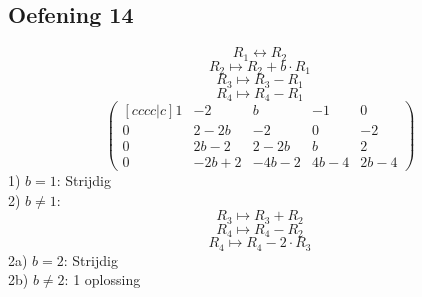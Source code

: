 \documentclass[lineaire_algebra_oplossingen.tex]{subfiles}
\begin{document}
\subsection{Oefening 14}
\[R_1 \leftrightarrow R_2 \]
\[R_2 \longmapsto R_2 + b\cdot R_1\]
\[R_3 \longmapsto R_3 - R_1\]
\[R_4 \longmapsto R_4 - R_1\]
\[
\begin{pmatrix}[cccc|c]
1 &  -2 &  b & -1 & 0\\
0 &  2-2b &  -2 & 0 & -2\\
0 & 2b-2 & 2-2b & b & 2\\
0 & -2b+2 & -4b-2 & 4b-4 & 2b-4
\end{pmatrix}
\]
1) $b=1$: Strijdig\\
2) $b \neq 1$:
\[R_3 \longmapsto R_3 + R_2\]
\[R_4 \longmapsto R_4 - R_2\]
\[R_4 \longmapsto R_4 -2 \cdot R_3\]
2a) $b=2$: Strijdig\\
2b) $b \neq 2$: 1 oplossing
\end{document}
